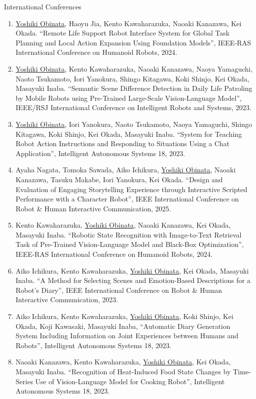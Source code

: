 \documentclass[a4paper,10pt]{article}
\newlength{\cvcolumngapwidth}
\newlength{\cvleftcolumnwidth}
\newlength{\cvrightcolumnwidth}
\newcommand{\cvheadingstyle}[1]{{\normalsize\cvheadingfont\textcolor{cvheadingcolor}{#1}}}
\newlength{\cvafteritemskipamount}
\newlength{\cvparskip}
\newcommand{\cvitem}[2]{
    \begin{minipage}[t]{\cvleftcolumnwidth}
        \raggedleft #1
    \end{minipage}%
    \hspace{\cvcolumngapwidth}%
    \begin{minipage}[t]{\cvrightcolumnwidth}
        \setlength{\parskip}{\cvparskip} #2
    \end{minipage}

    \vspace{\cvafteritemskipamount}
}
\begin{document}
\cvitem{
  \cvheadingstyle{International Conferences}
}{
  \begin{enumerate}
  \item \underline{Yoshiki Obinata}, Haoyu Jia, Kento Kawaharazuka, Naoaki Kanazawa, Kei Okada. ``Remote Life Support Robot Interface System for Global Task Planning and Local Action Expansion Using Foundation Models'', IEEE-RAS International Conference on Humanoid Robots, 2024.
  \item \underline{Yoshiki Obinata}, Kento Kawaharazuka, Naoaki Kanazawa, Naoya Yamaguchi, Naoto Tsukamoto, Iori Yanokura, Shingo Kitagawa, Koki Shinjo, Kei Okada, Masayuki Inaba. ``Semantic Scene Difference Detection in Daily Life Patroling by Mobile Robots using Pre-Trained Large-Scale Vision-Language Model'', IEEE/RSJ International Conference on Intelligent Robots and Systems, 2023.
  \item \underline{Yoshiki Obinata}, Iori Yanokura, Naoto Tsukamoto, Naoya Yamaguchi, Shingo Kitagawa, Koki Shinjo, Kei Okada, Masayuki Inaba. ``System for Teaching Robot Action Instructions and Responding to Situations Using a Chat Application'', Intelligent Autonomous Systems 18, 2023.
  \item Ayaha Nagata, Tomoka Sawada, Aiko Ichikura, \underline{Yoshiki Obinata}, Naoaki Kanazawa, Tasuku Makabe, Iori Yanokura, Kei Okada. ``Design and Evaluation of Engaging Storytelling Experience through Interactive Scripted Performance with a Character Robot'', IEEE International Conference on Robot \& Human Interactive Communication, 2025.
  \item Kento Kawaharazuka, \underline{Yoshiki Obinata}, Naoaki Kanazawa, Kei Okada, Masayuki Inaba. ``Robotic State Recognition with Image-to-Text Retrieval Task of Pre-Trained Vision-Language Model and Black-Box Optimization'', IEEE-RAS International Conference on Humanoid Robots, 2024.
  \item Aiko Ichikura, Kento Kawaharazuka, \underline{Yoshiki Obinata}, Kei Okada, Masayuki Inaba. ``A Method for Selecting Scenes and Emotion-Based Descriptions for a Robot's Diary'', IEEE International Conference on Robot \& Human Interactive Communication, 2023.
  \item Aiko Ichikura, Kento Kawaharazuka, \underline{Yoshiki Obinata}, Koki Shinjo, Kei Okada, Koji Kawasaki, Masayuki Inaba, ``Automatic Diary Generation System Including Information on Joint Experiences between Humans and Robots'', Intelligent Autonomous Systems 18, 2023.
  \item Naoaki Kanazawa, Kento Kawaharazuka, \underline{Yoshiki Obinata}, Kei Okada, Masayuki Inaba. ``Recognition of Heat-Induced Food State Changes by Time-Series Use of Vision-Language Model for Cooking Robot'', Intelligent Autonomous Systems 18, 2023.

\end{enumerate}}
\end{document}
